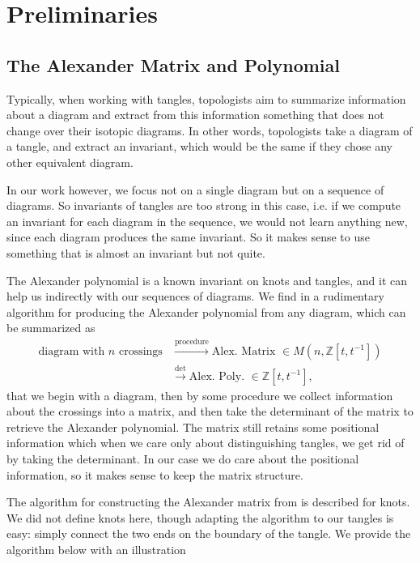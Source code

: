 \section{Preliminaries}

\subsection{The Alexander Matrix and Polynomial}

Typically, when working with tangles, topologists aim to summarize information about a diagram and extract from this information something that does not change over their isotopic diagrams. In other words, topologists take a diagram of a tangle, and extract an invariant, which would be the same if they chose any other equivalent diagram. 

In our work however, we focus not on a single diagram but on a sequence of diagrams. So invariants of tangles are too strong in this case, i.e. if we compute an invariant for each diagram in the sequence, we would not learn anything new, since each diagram produces the same invariant. So it makes sense to use something that is almost an invariant but not quite.

The Alexander polynomial is a known invariant on knots and tangles, and it can help us indirectly with our sequences of diagrams. We find in \citep{armstrong_1983} a rudimentary algorithm for producing the Alexander polynomial from any diagram, which can be summarized as
\begin{align*}
\text{diagram with } n \text{ crossings}
  &\xrightarrow{\text{procedure}} \text{Alex. Matrix } \in M(n,\mathbb Z[t,t^{-1}])\\
  &\xrightarrow{\det}\text{Alex. Poly. }\in \mathbb Z[t,t^{-1}],
\end{align*}
that we begin with a diagram, then by some procedure we collect information about the crossings into a matrix, and then take the determinant of the matrix to retrieve the Alexander polynomial. The matrix still retains some positional information which when we care only about distinguishing tangles, we get rid of by taking the determinant. In our case we do care about the positional information, so it makes sense to keep the matrix structure.

The algorithm for constructing the Alexander matrix from \citep{armstrong_1983} is described for knots. We did not define knots here, though adapting the algorithm to our tangles is easy: simply connect the two ends on the boundary of the tangle. We provide the algorithm below with an illustration


